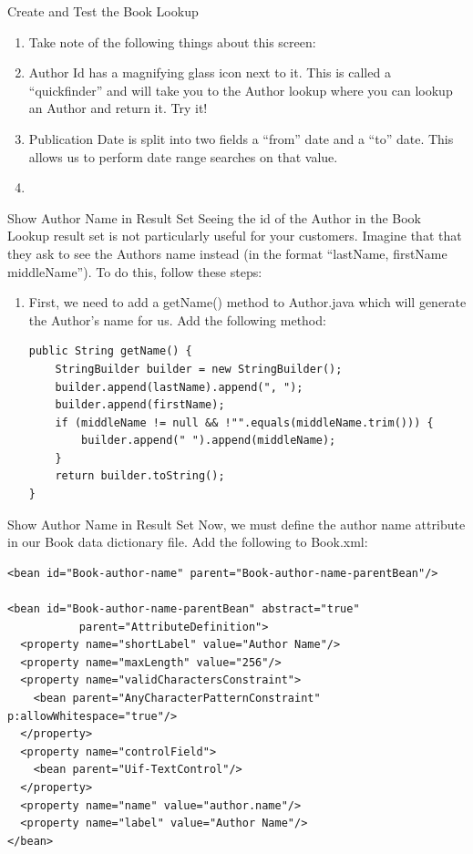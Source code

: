 \documentclass[xcolor=dvipsnames,14pt,professionalfonts]{beamer}
\begin{document}
          \begin{frame}{Create and Test the Book Lookup}
            \begin{enumerate}
            \item Take note of the following things about this screen:
              \item Author Id has a magnifying glass icon next to it.  This is called a “quickfinder” and will take you to the Author lookup where you can lookup an Author and return it.  Try it!
              \item Publication Date is split into two fields a “from”
                date and a “to” date.  This allows us to perform date
                range searches on that value.
              \item 
              \end{enumerate}
            \end{frame}
\begin{frame}[fragile]{Show Author Name in Result Set}
Seeing the id of the Author in the Book Lookup result set is not particularly useful for your customers.  Imagine that that they ask to see the Authors name instead (in the format “lastName, firstName middleName”).  To do this, follow these steps:
              \begin{enumerate}
              \item First, we need to add a getName() method to Author.java which will generate the Author’s name for us.  Add the following method:
    \begin{verbatim}
public String getName() {
	StringBuilder builder = new StringBuilder();
	builder.append(lastName).append(", ");
	builder.append(firstName);
	if (middleName != null && !"".equals(middleName.trim())) {
		builder.append(" ").append(middleName);
	}
	return builder.toString();
}
    \end{verbatim}
    \end{enumerate}
\end{frame}

\begin{frame}[fragile]{Show Author Name in Result Set}
Now, we must define the author name attribute in our Book data dictionary file.  Add the following to Book.xml:
    \begin{verbatim}
<bean id="Book-author-name" parent="Book-author-name-parentBean"/>

<bean id="Book-author-name-parentBean" abstract="true" 
           parent="AttributeDefinition">
  <property name="shortLabel" value="Author Name"/>
  <property name="maxLength" value="256"/>
  <property name="validCharactersConstraint">
    <bean parent="AnyCharacterPatternConstraint" p:allowWhitespace="true"/>
  </property>
  <property name="controlField">
    <bean parent="Uif-TextControl"/>
  </property>
  <property name="name" value="author.name"/>
  <property name="label" value="Author Name"/>
</bean>
    \end{verbatim}
\end{frame}
\end{document}
